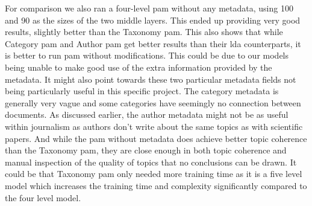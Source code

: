 For comparison we also ran a four-level \gls{pam} without any metadata, using 100 and 90 as the sizes of the two middle layers.
This ended up providing very good results, slightly better than the Taxonomy \gls{pam}.
This also shows that while Category \gls{pam} and Author \gls{pam} get better results than their \gls{lda} counterparts, it is better to run \gls{pam} without modifications.
This could be due to our models being unable to make good use of the extra information provided by the metadata.
It might also point towards these two particular metadata fields not being particularly useful in this specific project.
The category metadata is generally very vague and some categories have seemingly no connection between documents.
As discussed earlier, the author metadata might not be as useful within journalism as authors don't write about the same topics as with scientific papers.
And while the \gls{pam} without metadata does achieve better topic coherence than the Taxonomy \gls{pam}, they are close enough in both topic coherence and manual inspection of the quality of topics that no conclusions can be drawn.
It could be that Taxonomy \gls{pam} only needed more training time as it is a five level model which increases the training time and complexity significantly compared to the four level model.

